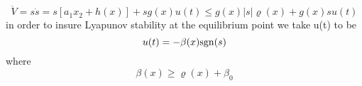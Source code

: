 \begin{equation}
  \dot{V} = s \dot{s} =  s[a_1 x_2 + h(x)] + s g(x) u(t) \leq g(x) \vert s\vert \varrho(x) + g(x) s u(t)
\end{equation}
in order to insure Lyapunov stability at the equilibrium point we take u(t) to be
\begin{equation}
  u(t) = -\beta(x) \mathrm{sgn}(s)
\end{equation}
where
\begin{equation}
  \beta (x) \geq \varrho (x) + \beta_0
\end{equation}
